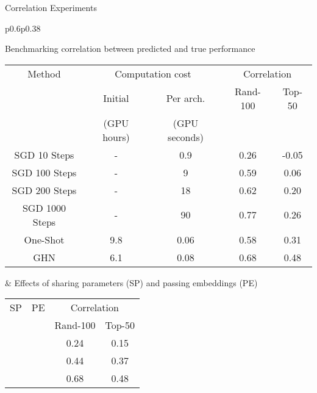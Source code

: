 \documentclass[final,t]{beamer}
\newcommand{\cmark}{\ding{51}}%
\newcommand{\xmark}{\ding{55}}%
\begin{document}
\begin{frame}{}
\begin{columns}[t]
\begin{column}{.47\linewidth}
	  
	\begin{exampleblock}{Correlation Experiments}
	\vspace{-1cm}
		\begin{tabular}{p{}p{}}
			\begin{table}[t]
			\center\footnotesize
			Benchmarking correlation between predicted and true performance
					\footnotesize
					\begin{center}
					\begin{tabular}{ c c c c c} 
					Method & \multicolumn{2}{c}{Computation cost}   & \multicolumn{2}{c}{Correlation}    \\ 
					 & Initial  & Per arch.   & Rand-100 & Top-50   \\ 
					 & (GPU hours) & (GPU seconds) &&\\
					\hline
					SGD 10 Steps & - & 0.9 & 0.26 & -0.05\\
					SGD 100 Steps & - & 9 & 0.59 & 0.06\\
					SGD 200 Steps & - & 18 & 0.62 & 0.20 \\
					SGD 1000 Steps & - & 90 & 0.77 & 0.26 \\
					One-Shot & 9.8 & 0.06 & 0.58 & 0.31\\
					\hline
					\hline
					GHN & 6.1 & 0.08 & 0.68 & 0.48
				\end{tabular}
				\end{center}
			\end{table}	

			
			 &
			\center\footnotesize
			Effects of sharing parameters (SP) and passing embeddings (PE)
			 \vspace{1cm}
		   	\begin{table}[t]
				\footnotesize
				\begin{center}
				\begin{tabular}{ c c c c} 
				SP & PE & \multicolumn{2}{c}{Correlation}    \\ 
				 &&  Rand-100 & Top-50   \\ 
				\hline
				\xmark & \xmark & 0.24 & 0.15\\
				\xmark & \cmark  &  0.44 & 0.37\\
				\cmark & \cmark  & 0.68 & 0.48 
				\end{tabular}
				\end{center}
			\end{table}


\end{tabular}
\end{exampleblock}
\end{column}
\end{columns}
\end{frame}
\end{document}
